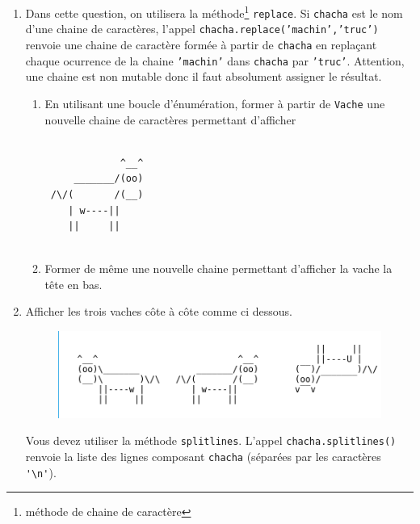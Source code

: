 \begin{enumerate}
\begin{enumerate}
 \item Quels sont les caractères de numéros 47, 60, 92, 95, 8254, 8725 ?
 \item En utilisant \texttt{lili.append(truc)} pour insérer \texttt{truc} à la fin de la liste \texttt{lili} ainsi que \texttt{in} dans un test, former la liste de tous les numéros distincts des caractères qui forment \texttt{Vache}. En examinant la suite des caractères de \texttt{Vache}, Que pensez vous de celui de numéro 10? Est-il égal à la chaine de caractère \verb|'\n'|?
\end{enumerate}
\item Dans cette question, on utilisera la méthode\footnote{méthode de chaine de caractère} \texttt{replace}. Si \texttt{chacha} est le nom d'une chaine de caractères, l'appel \texttt{chacha.replace('machin','truc')} renvoie une chaine de caractère formée à partir de \texttt{chacha} en replaçant chaque ocurrence de la chaine \texttt{'machin'} dans \texttt{chacha} par  \texttt{'truc'}. Attention, une chaine est non mutable donc il faut absolument assigner le résultat.
\begin{enumerate}
 \item En utilisant une boucle d'énumération, former à partir de \texttt{Vache} une nouvelle chaine de caractères permettant d'afficher
\begin{verbatim}
  
             ^__^   
     _______/(oo)   
 /\/(       /(__)   
    | w----||       
    ||     ||       
   
\end{verbatim}
\item Former de même une nouvelle chaine permettant d'afficher la vache la tête en bas. 
\end{enumerate}
\item Afficher les trois vaches côte à côte comme ci dessous.
\begin{figure}[h]
 \centering
 \includegraphics{./Evachscii_1.png}
\end{figure}
\newline
Vous devez utiliser la méthode \texttt{splitlines}. L'appel \texttt{chacha.splitlines()} renvoie la liste des lignes composant \texttt{chacha} (séparées par les caractères \verb|'\n'|). 
\end{enumerate}
